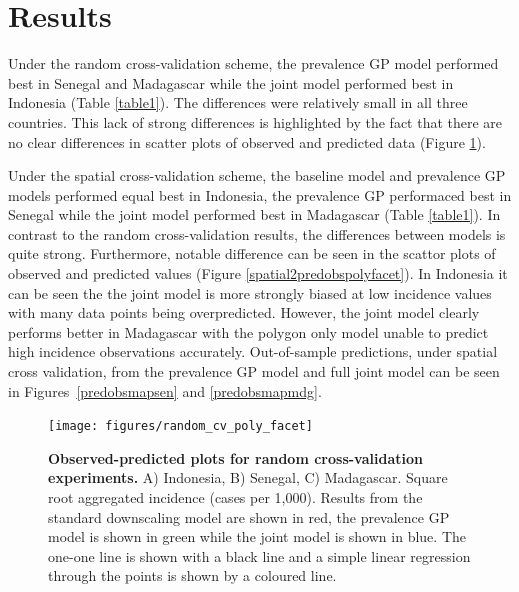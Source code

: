 \documentclass[10pt,letterpaper]{article}
\begin{document}
\section*{Results}


Under the random cross-validation scheme, the prevalence GP model performed best in Senegal and Madagascar while the joint model performed best in Indonesia (Table \ref{table1}).
The differences were relatively small in all three countries.
This lack of strong differences is highlighted by the fact that there are no clear differences in scatter plots of observed and predicted data (Figure \ref{randompredobspolyfacet}).




Under the spatial cross-validation scheme, the baseline model and prevalence GP models performed equal best in Indonesia, the prevalence GP performaced best in Senegal while the joint model performed best in Madagascar (Table \ref{table1}).
In contrast to the random cross-validation results, the differences between models is quite strong.
Furthermore, notable difference can be seen in the scattor plots of observed and predicted values (Figure \ref{spatial2predobspolyfacet}).
In Indonesia it can be seen the the joint model is more strongly biased at low incidence values with many data points being overpredicted.
However, the joint model clearly performs better in Madagascar with the polygon only model unable to predict high incidence observations accurately.
Out-of-sample predictions, under spatial cross validation, from the prevalence GP model and full joint model can be seen in Figures~\ref{predobsmapsen} and \ref{predobsmapmdg}.

\begin{figure}
\texttt{[image: figures/random\_cv\_poly\_facet]}  
\caption{{\bf Observed-predicted plots for random cross-validation experiments.}
A) Indonesia, B) Senegal, C) Madagascar. Square root aggregated incidence (cases per 1,000).
Results from the standard downscaling model are shown in red, the prevalence GP model is shown in green while the joint model is shown in blue.
The one-one line is shown with a black line and a simple linear regression through the points is shown by a coloured line.
}
\label{randompredobspolyfacet}
\end{figure}
\end{document}
